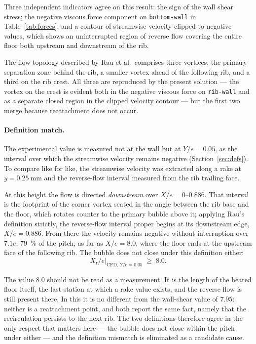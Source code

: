 \documentclass[11pt,a4paper]{article}
\newcommand{\Xr}{X_{\mathrm{r}}}
\begin{document}
Three independent indicators agree on this result: the sign of the wall
shear stress; the negative viscous force component on \texttt{bottom-wall}
in Table~\ref{tab:forces}; and a contour of streamwise velocity clipped to
negative values, which shows an uninterrupted region of reverse flow
covering the entire floor both upstream and downstream of the rib.

The flow topology described by Rau et al.\ comprises three vortices: the
primary separation zone behind the rib, a smaller vortex ahead of the
following rib, and a third on the rib crest. All three are reproduced by the
present solution --- the vortex on the crest is evident both in the negative
viscous force on \texttt{rib-wall} and as a separate closed region in the
clipped velocity contour --- but the first two merge because reattachment
does not occur.

\paragraph{Definition match.} The experimental value is measured not at the
wall but at $Y/e = 0.05$, as the interval over which the streamwise velocity
remains negative (Section~\ref{sec:defs}). To compare like for like, the
streamwise velocity was extracted along a rake at $y = \SI{0.25}{\milli\meter}$
and the reverse-flow interval measured from the rib trailing face.

At this height the flow is directed \emph{downstream} over
$X/e = 0$--$0.886$. That interval is the footprint of the corner vortex
seated in the angle between the rib base and the floor, which rotates
counter to the primary bubble above it; applying Rau's definition strictly,
the reverse-flow interval proper begins at its downstream edge,
$X/e = 0.886$. From there the velocity remains negative without
interruption over $7.1e$, \SI{79}{\percent} of the pitch, as far as
$X/e = 8.0$, where the floor ends at the upstream face of the following
rib. The bubble does not close under this definition either:
\begin{equation}
  \Xr/e \big|_{\text{CFD},\,Y/e=0.05} \;\geq\; 8.0 .
\end{equation}

The value $8.0$ should not be read as a measurement. It is the length of
the heated floor itself, the last station at which a rake value exists, and
the reverse flow is still present there. In this it is no different from
the wall-shear value of $7.95$: neither is a reattachment point, and both
report the same fact, namely that the recirculation persists to the next
rib. The two definitions therefore agree in the only respect that matters
here --- the bubble does not close within the pitch under either --- and
the definition mismatch is eliminated as a candidate cause.
\end{document}
